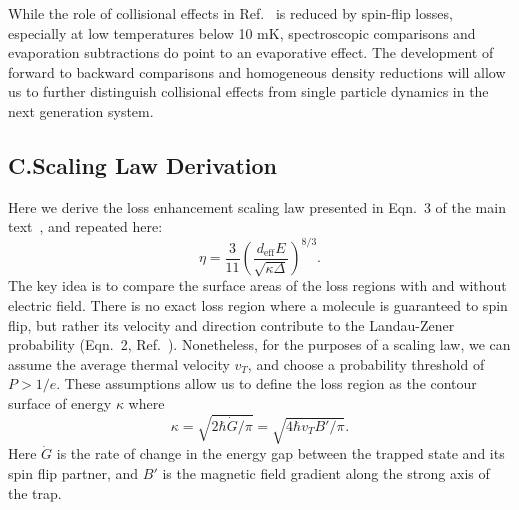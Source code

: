 \documentclass[%
 reprint,
 amsmath,amssymb,
 aps,
prl,
]{revtex4-1}
\begin{document}

While the role of collisional effects in Ref.~\cite{Stuhl2012evap} is reduced by spin-flip losses, especially at low temperatures below 10 mK,
spectroscopic comparisons and evaporation subtractions do point to an evaporative effect. The development of forward to backward comparisons and homogeneous density reductions will allow us to further distinguish collisional effects from single particle dynamics in the next generation system.

\subsection{C.\quad Scaling Law Derivation\label{sec:der}}

Here we derive the loss enhancement scaling law presented in Eqn.~3 of the main text~\cite{smt}, and repeated here:
\begin{equation}
\eta=\frac{3}{11} \left(\frac{d_\text{eff}E}{\sqrt{\kappa\Delta}}\right)^{8/3}.
\end{equation}
The key idea is to compare the surface areas of the loss regions with and without electric field.
There is no exact loss region where a molecule is guaranteed to spin flip, but rather its velocity and direction contribute to the Landau-Zener probability (Eqn.~2, Ref.~\cite{smt}).
Nonetheless, for the purposes of a scaling law, we can assume the average thermal velocity $v_T$, and choose a probability threshold of $P>1/e$.
These assumptions allow us to define the loss region as the contour surface of energy $\kappa$ where
\begin{equation}
\kappa=\sqrt{2\hbar\dot{G}/\pi}=\sqrt{4\hbar v_T B'/\pi}.
\end{equation}
Here $\dot{G}$ is the rate of change in the energy gap between the trapped state and its spin flip partner, and $B'$ is the magnetic field gradient along the strong axis of the trap.
\end{document}

